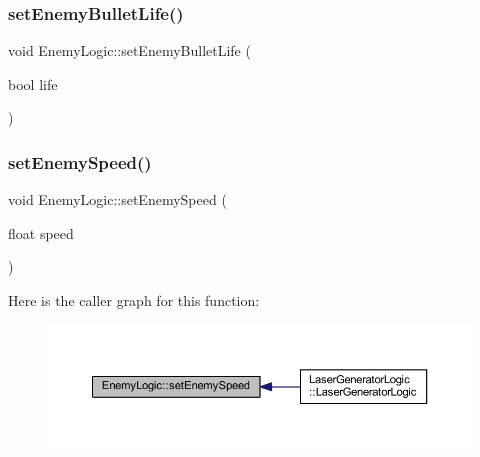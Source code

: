 \mbox{\label{class_enemy_logic_a88584f95e49bfd6b174b9b1d9a274cc5}} 
\subsubsection{\texorpdfstring{set\+Enemy\+Bullet\+Life()}{setEnemyBulletLife()}}
{\footnotesize\ttfamily void Enemy\+Logic\+::set\+Enemy\+Bullet\+Life (\begin{DoxyParamCaption}\item[{bool}]{life }\end{DoxyParamCaption})}

\mbox{\label{class_enemy_logic_aae66ecc1d28feaef7c814a0dff7eed95}} 
\subsubsection{\texorpdfstring{set\+Enemy\+Speed()}{setEnemySpeed()}}
{\footnotesize\ttfamily void Enemy\+Logic\+::set\+Enemy\+Speed (\begin{DoxyParamCaption}\item[{float}]{speed }\end{DoxyParamCaption})}

Here is the caller graph for this function\+:
\nopagebreak
\begin{figure}[H]
\begin{center}
\leavevmode
\includegraphics[width=350pt]{class_enemy_logic_aae66ecc1d28feaef7c814a0dff7eed95_icgraph}
\end{center}
\end{figure}
\mbox{\label{class_enemy_logic_a12bce0a6b6cad1af96aee3b401ea2c45}} 
